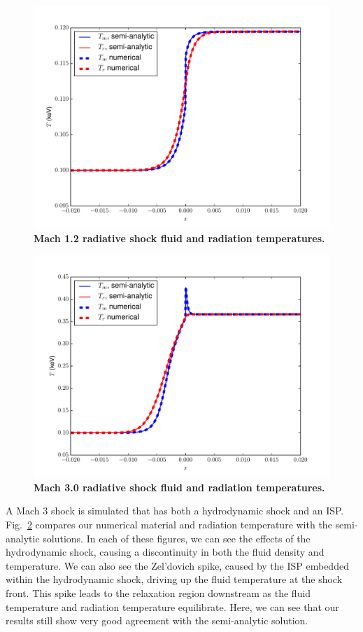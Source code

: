 \documentclass[preprint,12pt]{elsarticle}
\begin{document}
\begin{figure}[ht!]
\centering
\includegraphics[scale=0.60]{figures/radshock_mach_1_2.pdf}
\caption{\label{fig:mach1.2T}\bf Mach 1.2 radiative shock fluid and radiation temperatures.} 
\end{figure}

\begin{figure}[ht!]
\centering
\includegraphics[scale=0.60]{figures/radshock_mach_3_0.pdf}
\caption{\label{fig:mach3.0T}\bf Mach 3.0 radiative shock fluid and radiation temperatures.} 
\end{figure}


A Mach 3 shock is simulated that has both a hydrodynamic shock and an ISP.
Fig.~\ref{fig:mach3.0T} compares our numerical material and radiation temperature with the semi-analytic solutions.  In each of these
figures, we can see the effects of the hydrodynamic shock, causing a discontinuity in both the fluid density and
temperature.  We can also see the Zel'dovich spike, caused by the ISP embedded within the hydrodynamic shock, driving up
the fluid temperature at the shock front.  This spike leads to the relaxation region downstream as the fluid temperature
and radiation temperature equilibrate. Here, we can see that our results still show very good agreement with the semi-analytic solution.
\end{document}
